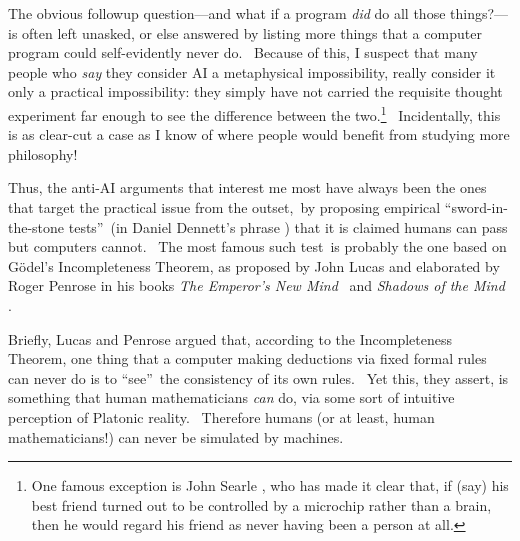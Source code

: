 \documentclass[11pt,onecolumn]{article}%
\begin{document}
The obvious followup question---and what if a program \textit{did} do all
those things?---is often left unasked, or else answered by listing more things
that a computer program could self-evidently never do. \ Because of this, I
suspect that many people who \textit{say} they consider AI a metaphysical
impossibility, really consider it only a practical impossibility: they simply
have not carried the requisite thought experiment far enough to see the
difference between the two.\footnote{One famous exception is John Searle
\cite{searle}, who has made it clear that, if (say) his best friend turned out
to be controlled by a microchip rather than a brain, then he would regard his
friend as never having been a person at all.} \ Incidentally, this is as
clear-cut a case as I know of where people would benefit from studying more philosophy!

Thus, the anti-AI arguments that interest me most have always been the ones
that target the practical issue from the outset,\ by proposing empirical
\textquotedblleft sword-in-the-stone tests\textquotedblright\ (in Daniel
Dennett's phrase \cite{dennett}) that it is claimed humans can pass but
computers cannot. \ The most famous such test\ is probably the one based on
G\"{o}del's Incompleteness Theorem, as proposed by John Lucas \cite{lucas} and
elaborated by Roger Penrose in his books \textit{The Emperor's New Mind}
\cite{penrose}\ and \textit{Shadows of the Mind} \cite{penrose:shadows}.

Briefly, Lucas and Penrose argued that, according to the Incompleteness
Theorem, one thing that a computer making deductions via fixed formal rules
can never do is to \textquotedblleft see\textquotedblright\ the consistency of
its own rules. \ Yet this, they assert, is something that human mathematicians
\textit{can} do, via some sort of intuitive perception of Platonic reality.
\ Therefore humans (or at least, human mathematicians!) can never be simulated
by machines.
\end{document}
